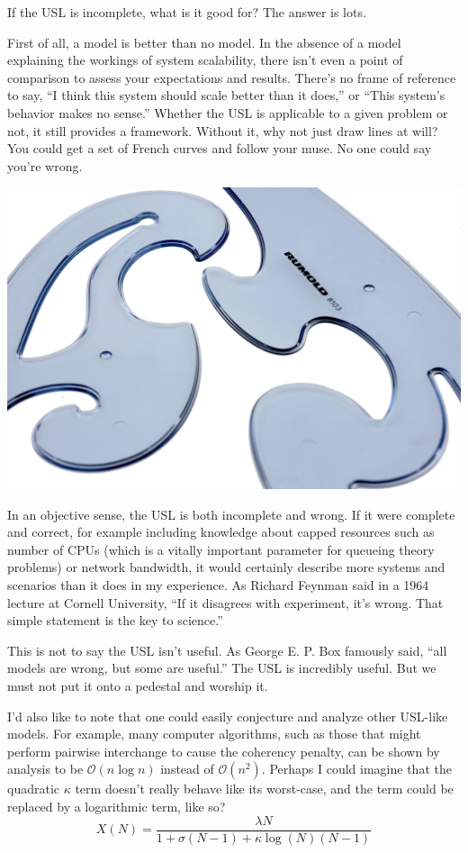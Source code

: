\documentclass{vivid_layout}
\begin{document}
If the USL is incomplete, what is it good for? The answer is lots.

First of all, a model is better than no model. In the absence of a model
explaining the workings of system scalability, there isn't even a point of
comparison to assess your expectations and results. There's no frame of
reference to say, ``I think this system should scale better than it does,'' or
``This system's behavior makes no sense.'' Whether the USL is applicable to a
given problem or not, it still provides a framework. Without it, why not just
draw lines at will? You could get a set of French curves and follow your muse.
No one could say you're wrong.
\begin{center}
\includegraphics[width=.85\linewidth,trim={0 8cm 0 0},clip]{scalability/french_curve}
\end{center}

In an objective sense, the USL is both incomplete and wrong.  If it were
complete and correct, for example including knowledge about capped resources
such as number of CPUs (which is a vitally important parameter for queueing
theory problems) or network bandwidth, it would certainly describe more systems
and scenarios than it does in my experience. As Richard Feynman said in a 1964
lecture at Cornell University, ``If it disagrees with experiment, it’s wrong.
That simple statement is the key to science.''

This is not to say the USL isn't useful. As George E. P. Box famously said,
``all models are wrong, but some are useful.'' The USL is incredibly useful. But
we must not put it onto a pedestal and worship it.  

I'd also like to note that one could easily conjecture and analyze other
USL-like models. For example, many computer algorithms, such as those
that might perform pairwise interchange to cause the coherency penalty, can be shown
by analysis to be $\mathcal{O}(n\log{}n)$ instead of $\mathcal{O}(n^2)$. Perhaps
I could imagine that the quadratic $\kappa$ term doesn't really behave like its
worst-case, and the term could be replaced by a logarithmic term, like so?
\begin{equation}
X(N) = \frac{\lambda N}{1 + \sigma(N-1) + \kappa \log(N)(N-1)}
\label{usl_log}
\end{equation}
\end{document}
